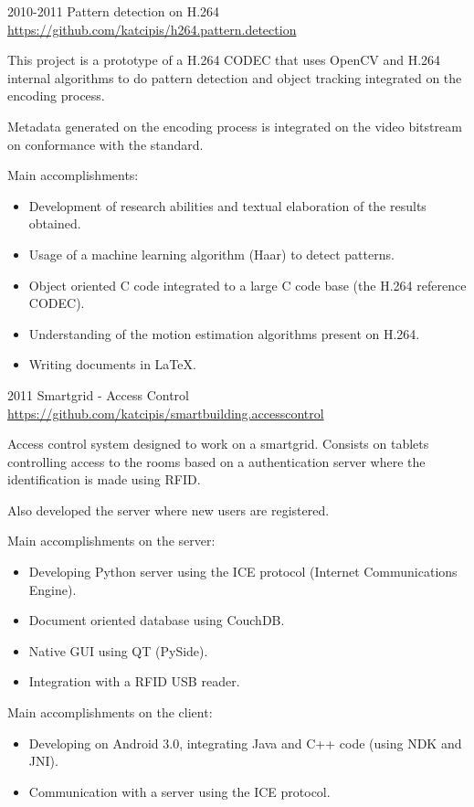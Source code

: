 \documentclass[]{friggeri-cv} %
\begin{document}
\begin{entrylist}
\entry
{2010-2011}
{Pattern detection on H.264}
{\href{https://github.com/katcipis/h264.pattern.detection}{https://github.com/katcipis/h264.pattern.detection}}
{
This project is a prototype of a H.264 CODEC that uses OpenCV and H.264 internal algorithms to do pattern detection and
object tracking integrated on the encoding process.

Metadata generated on the encoding process is integrated on the video bitstream on conformance with the standard.

Main accomplishments:\\
\begin{itemize}
\item Development of research abilities and textual elaboration of the results obtained.
\item Usage of a machine learning algorithm (Haar) to detect patterns.
\item Object oriented C code integrated to a large C code base (the H.264 reference CODEC).
\item Understanding of the motion estimation algorithms present on H.264.
\item Writing documents in LaTeX.
\end{itemize}
}
\end{entrylist}

\begin{entrylist}
\entry
{2011}
{Smartgrid - Access Control}
{\href{https://github.com/katcipis/smartbuilding.accesscontrol}{https://github.com/katcipis/smartbuilding.accesscontrol}}
{

Access control system designed to work on a smartgrid. Consists on tablets controlling access to the rooms based on
a authentication server where the identification is made using RFID.

Also developed the server where new users are registered.

Main accomplishments on the server:\\
\begin{itemize}
\item Developing Python server using the ICE protocol (Internet Communications Engine).
\item Document oriented database using CouchDB.
\item Native GUI using QT (PySide).
\item Integration with a RFID USB reader.
\end{itemize}

Main accomplishments on the client:\\
\begin{itemize}
\item Developing on Android 3.0, integrating Java and C++ code (using NDK and JNI).
\item Communication with a server using the ICE protocol.
\end{itemize}
}
\end{entrylist}
\end{document}
